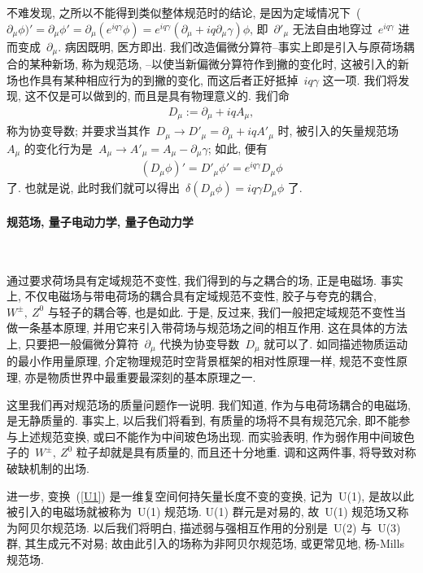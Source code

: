不难发现, 之所以不能得到类似整体规范时的结论, 是因为定域情况下~($\partial_\mu\phi)'=\partial_\mu\phi'=\partial_\mu(e^{iq\gamma}\phi)=e^{iq\gamma}(\partial_\mu+iq\partial_\mu\gamma)\phi$, 即~$\partial'_\mu$ 无法自由地穿过~$e^{iq\gamma}$ 进而变成~$\partial_\mu$. 病因既明, 医方即出. 我们改造偏微分算符--事实上即是引入与原荷场耦合的某种新场, 称为规范场, --以使当新偏微分算符作到撇的变化时, 这被引入的新场也作具有某种相应行为的到撇的变化, 而这后者正好抵掉~$iq\gamma$ 这一项. 我们将发现, 这不仅是可以做到的, 而且是具有物理意义的. 我们命
\begin{align}
D_\mu:=\partial_\mu+iqA_\mu,
\end{align}
称为协变导数; 并要求当其作~$D_\mu\rightarrow D'_\mu=\partial_\mu+iqA'_\mu$ 时, 被引入的矢量规范场~$A_\mu$ 的变化行为是~$A_\mu\rightarrow A'_\mu=A_\mu-\partial_\mu\gamma$; 如此, 便有
\begin{align}
(D_\mu\phi)'=D'_\mu \phi'=e^{iq\gamma}D_\mu\phi
\end{align}
了. 也就是说, 此时我们就可以得出~$\delta(D_\mu\phi)=iq\gamma D_\mu\phi$ 了.


\paragraph{规范场, 量子电动力学, 量子色动力学}~

通过要求荷场具有定域规范不变性, 我们得到的与之耦合的场, 正是电磁场. 事实上, 不仅电磁场与带电荷场的耦合具有定域规范不变性, 胶子与夸克的耦合, $W^\pm,~Z^0$ 与轻子的耦合等, 也是如此. 于是, 反过来, 我们一般把定域规范不变性当做一条基本原理, 并用它来引入带荷场与规范场之间的相互作用. 这在具体的方法上, 只要把一般偏微分算符~$\partial_\mu$ 代换为协变导数~$D_\mu$ 就可以了. 如同描述物质运动的最小作用量原理, 介定物理规范时空背景框架的相对性原理一样, 规范不变性原理, 亦是物质世界中最重要最深刻的基本原理之一.

这里我们再对规范场的质量问题作一说明. 我们知道, 作为与电荷场耦合的电磁场, 是无静质量的. 事实上, 以后我们将看到, 有质量的场将不具有规范冗余, 即不能参与上述规范变换, 或曰不能作为中间玻色场出现. 而实验表明, 作为弱作用中间玻色子的~$W^\pm,~Z^0$ 粒子却就是具有质量的, 而且还十分地重. 调和这两件事, 将导致对称破缺机制的出场.


进一步, 变换~(\ref{U1}) 是一维复空间何持矢量长度不变的变换, 记为~U(1), 是故以此被引入的电磁场就被称为~U(1) 规范场. U(1) 群元是对易的, 故~U(1) 规范场又称为阿贝尔规范场. 以后我们将明白, 描述弱与强相互作用的分别是~U(2) 与~U(3) 群, 其生成元不对易; 故由此引入的场称为非阿贝尔规范场, 或更常见地, 杨-Mills 规范场.


